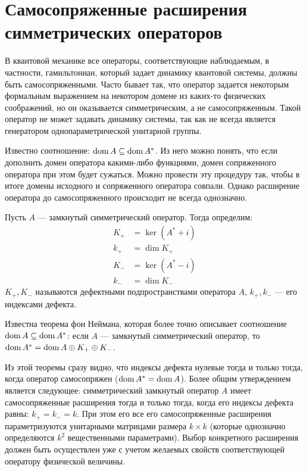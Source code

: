 \section{Самосопряженные расширения симметрических операторов}
В квантовой механике все операторы, соответствующие наблюдаемым, в частности, гамильтониан, который задает динамику квантовой системы, должны быть самосопряженными. Часто бывает так, что оператор задается некоторым формальным выражением на некотором домене из каких-то физических соображений, но он оказывается симметрическим, а не самосопряженным. Такой оператор не может задавать динамику системы, так как не всегда является генератором однопараметрической унитарной группы.

Известно соотношение: $\operatorname{dom} A \subseteq \operatorname{dom} A^*$. Из него можно понять, что если дополнить домен оператора какими-либо функциями, домен сопряженного оператора при этом будет сужаться. Можно провести эту процедуру так, чтобы в итоге домены исходного и сопряженного оператора совпали. Однако расширение оператора до самосопряженного происходит не всегда однозначно.

Пусть $A$ — замкнутый симметрический оператор. Тогда определим:
\begin{align*}
K_+ &= \ker (A^* + i) \\
k_+ &= \dim K_+ \\
K_- &= \ker (A^* - i) \\
k_- &= \dim K_-
\end{align*}
$K_+, K_-$ называются дефектными подпространствами оператора $A$, $k_+, k_-$ — его индексами дефекта.

Известна теорема фон Неймана, которая более точно описывает соотношение $\operatorname{dom} A \subseteq \operatorname{dom} A^*$: если $A$ — замкнутый симметрический оператор, то $\operatorname{dom} A^* = \operatorname{dom} A \oplus K_+ \oplus K_-$.

Из этой теоремы сразу видно, что индексы дефекта нулевые тогда и только тогда, когда оператор самосопряжен ($\operatorname{dom} A^* = \operatorname{dom} A$). Более общим утверждением является следующее: симметрический замкнутый оператор $A$ имеет самосопряженные расширения тогда и только тогда, когда его индексы дефекта равны: $k_+ = k_- = k$. При этом его все его самосопряженные расширения параметризуются унитарными матрицами размера $k \times k$ (которые однозначно определяются $k^2$ вещественными параметрами). Выбор конкретного расширения должен быть осуществлен уже с учетом желаемых свойств соответствующей оператору физической величины.
